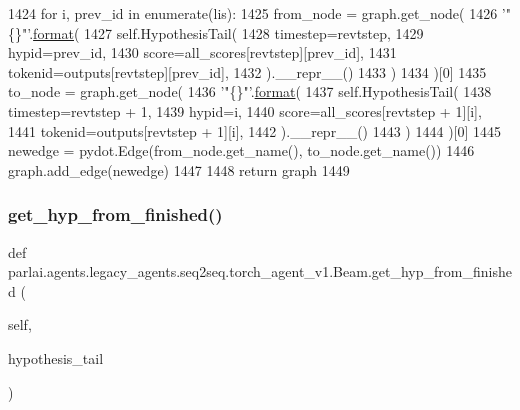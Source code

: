 \begin{DoxyCode}
1424             \textcolor{keywordflow}{for} i, prev\_id \textcolor{keywordflow}{in} enumerate(lis):
1425                 from\_node = graph.get\_node(
1426                     \textcolor{stringliteral}{'"\{\}"'}.\hyperlink{namespaceparlai_1_1chat__service_1_1services_1_1messenger_1_1shared__utils_a32e2e2022b824fbaf80c747160b52a76}{format}(
1427                         self.HypothesisTail(
1428                             timestep=revtstep,
1429                             hypid=prev\_id,
1430                             score=all\_scores[revtstep][prev\_id],
1431                             tokenid=outputs[revtstep][prev\_id],
1432                         ).\_\_repr\_\_()
1433                     )
1434                 )[0]
1435                 to\_node = graph.get\_node(
1436                     \textcolor{stringliteral}{'"\{\}"'}.\hyperlink{namespaceparlai_1_1chat__service_1_1services_1_1messenger_1_1shared__utils_a32e2e2022b824fbaf80c747160b52a76}{format}(
1437                         self.HypothesisTail(
1438                             timestep=revtstep + 1,
1439                             hypid=i,
1440                             score=all\_scores[revtstep + 1][i],
1441                             tokenid=outputs[revtstep + 1][i],
1442                         ).\_\_repr\_\_()
1443                     )
1444                 )[0]
1445                 newedge = pydot.Edge(from\_node.get\_name(), to\_node.get\_name())
1446                 graph.add\_edge(newedge)
1447 
1448         \textcolor{keywordflow}{return} graph
1449 \end{DoxyCode}
\mbox{\label{classparlai_1_1agents_1_1legacy__agents_1_1seq2seq_1_1torch__agent__v1_1_1Beam_a5ae82a3d567dd8f282678d0ee40aa41e}} 
\subsubsection{\texorpdfstring{get\+\_\+hyp\+\_\+from\+\_\+finished()}{get\_hyp\_from\_finished()}}
{\footnotesize\ttfamily def parlai.\+agents.\+legacy\+\_\+agents.\+seq2seq.\+torch\+\_\+agent\+\_\+v1.\+Beam.\+get\+\_\+hyp\+\_\+from\+\_\+finished (\begin{DoxyParamCaption}\item[{}]{self,  }\item[{}]{hypothesis\+\_\+tail }\end{DoxyParamCaption})}

